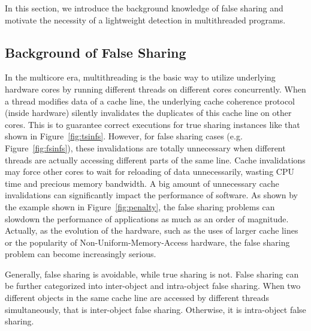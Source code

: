 \label{sec:overview}

In this section, we introduce the background knowledge of false sharing 
and motivate the necessity of a lightweight detection in multithreaded programs.

\subsection{Background of False Sharing}
\label{sec:background}

In the multicore era, multithreading is the basic way to utilize underlying hardware cores by running different threads on different cores concurrently. When a thread modifies data of a cache line, the underlying cache coherence protocol (inside hardware) silently invalidates the duplicates of this cache line on other cores. This is to guarantee correct executions for true sharing instances like that shown in Figure~\ref{fig:tsinfs}. However, for false sharing cases (e.g. Figure~\ref{fig:fsinfs}), these invalidations are totally unnecessary when different threads are actually accessing different parts of the same line. Cache invalidations may force other cores to wait for reloading of data unnecessarily, wasting CPU time and precious memory bandwidth. A big amount of unnecessary cache invalidations can significantly impact the performance of software. As shown by the example shown in Figure~\ref{fig:penalty}, the false sharing problems can slowdown the performance of applications as much as an order of magnitude. Actually, as the evolution of the hardware, such as the uses of larger cache lines or the popularity of Non-Uniform-Memory-Access hardware, the false sharing problem can become increasingly serious. 

Generally, false sharing is avoidable, while true sharing is not. False sharing can be further categorized into inter-object and intra-object false sharing. When two different objects in the same cache line are accessed by different threads simultaneously, that is inter-object false sharing. Otherwise, it is intra-object false sharing.  %

